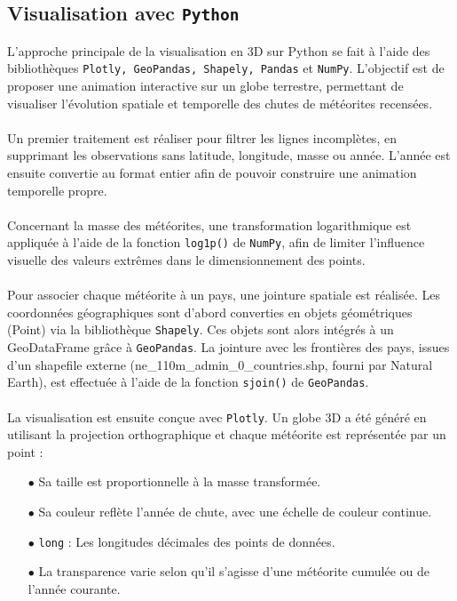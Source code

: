\documentclass[12pt]{article}
\begin{document}
\subsection{Visualisation avec \texttt{Python}}
L’approche principale de la visualisation en 3D sur Python se fait à l’aide des bibliothèques \texttt{Plotly, GeoPandas, Shapely, Pandas} et \texttt{NumPy}. L'objectif est de proposer une animation interactive sur un globe terrestre, permettant de visualiser l’évolution spatiale et temporelle des chutes de météorites recensées.\\
\\
Un premier traitement est réaliser pour filtrer les lignes incomplètes, en supprimant les observations sans latitude, longitude, masse ou année. L’année est ensuite convertie au format entier afin de pouvoir construire une animation temporelle propre.\\
\\
Concernant la masse des météorites, une transformation logarithmique est appliquée à l’aide de la fonction \texttt{log1p()} de \texttt{NumPy}, afin de limiter l’influence visuelle des valeurs extrêmes dans le dimensionnement des points.\\
\\
Pour associer chaque météorite à un pays, une jointure spatiale est réalisée. Les coordonnées géographiques sont d’abord converties en objets géométriques (Point) via la bibliothèque \texttt{Shapely}. Ces objets sont alors intégrés à un GeoDataFrame grâce à \texttt{GeoPandas}. La jointure avec les frontières des pays, issues d’un shapefile externe (ne\_110m\_admin\_0\_countries.shp, fourni par Natural Earth), est effectuée à l’aide de la fonction \texttt{sjoin()} de \texttt{GeoPandas}.\\
\\
La visualisation est ensuite conçue avec \texttt{Plotly}. Un globe 3D a été généré en utilisant la projection orthographique et chaque météorite est représentée par un point :\\
\begin{itemize}
    \item[$\bullet$] Sa taille est proportionnelle à la masse transformée.
    \item[$\bullet$] Sa couleur reflète l’année de chute, avec une échelle de couleur continue.
    \item[$\bullet$] \texttt{long} : Les longitudes décimales des points de données.
    \item[$\bullet$] La transparence varie selon qu’il s’agisse d’une météorite cumulée ou de l’année courante.
\end{itemize}
\end{document}
